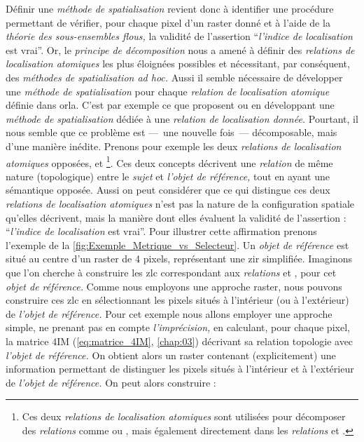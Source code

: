 Définir une \emph{méthode de spatialisation} revient donc à identifier une procédure permettant de vérifier, pour chaque pixel d'un raster donné et à l'aide de la \emph{théorie des sous-ensembles flous,} la validité de l'assertion \enquote{\emph{l'indice de localisation} est vrai}. Or, le \emph{principe de décomposition} nous a amené à définir des \emph{relations de localisation atomiques} les plus éloignées possibles et nécessitant, par conséquent, des \emph{méthodes de spatialisation ad hoc.} Aussi il semble nécessaire de développer une \emph{méthode de spatialisation} pour chaque \emph{relation de localisation atomique} définie dans \ac{orla}. C'est par exemple ce que proposent \textcite{Vanegas2011} ou \textcite{Takemura2012} en développant une \emph{méthode de spatialisation} dédiée à une \emph{relation de localisation donnée.} Pourtant, il nous semble que ce problème est ---~une nouvelle fois~--- décomposable, mais d'une manière inédite. Prenons pour exemple les deux \emph{relations de localisation atomiques} opposées,  et  \footnote{Ces deux \emph{relations de localisation atomiques} sont utilisées pour décomposer des \emph{relations} comme \protect{} ou \protect{}, mais également directement dans les \emph{relations} \protect{} et \protect{}.}. Ces deux concepts décrivent une \emph{relation} de même nature (\ie topologique) entre le \emph{sujet} et \emph{l'objet de référence,} tout en ayant une sémantique opposée. Aussi on peut considérer que ce qui distingue ces deux \emph{relations de localisation atomiques} n'est pas la nature de la configuration spatiale qu'elles décrivent, mais la manière dont elles évaluent la validité de l'assertion : \enquote{\emph{l'indice de localisation} est vrai}. Pour illustrer cette affirmation prenons l'exemple de la \autoref{fig:Exemple_Metrique_vs_Selecteur}. Un \emph{objet de référence} est situé au centre d'un raster de 4 pixels, représentant une \ac{zir} simplifiée. Imaginons que l'on cherche à construire les \ac{zlc} correspondant aux \emph{relations}  et , pour cet \emph{objet de référence.} Comme nous employons une approche raster, nous pouvons construire ces \ac{zlc} en sélectionnant les pixels situés à l'intérieur (ou à l'extérieur) de \emph{l'objet de référence.} Pour cet exemple nous allons employer une approche simple, ne prenant pas en compte \emph{l'imprécision,} en calculant, pour chaque pixel, la matrice 4IM (\autoref{eq:matrice_4IM}, \autoref{chap:03}) décrivant sa relation topologie avec \emph{l'objet de référence.} On obtient alors un raster contenant (explicitement) une information permettant de distinguer les pixels situés à l'intérieur et à l'extérieur de \emph{l'objet de référence.} On peut alors construire :

